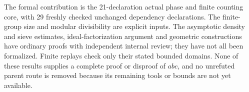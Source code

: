 The formal contribution is the 21-declaration actual phase and finite
counting core, with 29 freshly checked unchanged dependency declarations.
The finite-group size and modular divisibility are explicit inputs.
The asymptotic density and sieve estimates, ideal-factorization argument
and geometric constructions have ordinary proofs with independent
internal review; they have not all been formalized. Finite replays
check only their stated bounded domains. None of these results supplies
a complete proof or disproof of $abc$, and no unrefuted parent route
is removed because its remaining tools or bounds are not yet available.
